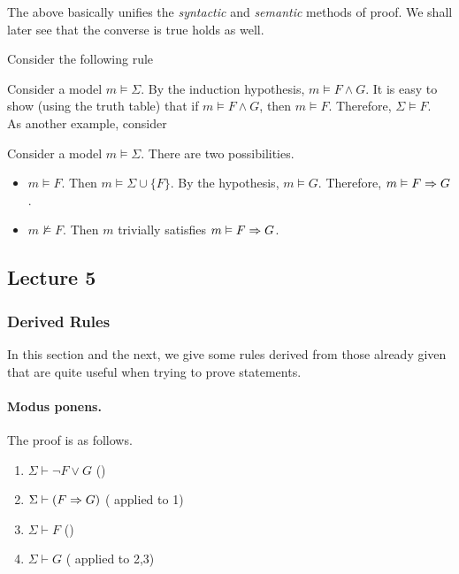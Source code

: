 The above basically unifies the \textit{syntactic} and \textit{semantic} methods of proof. We shall later see that the converse is true holds as well.

Consider the following rule
\begin{prooftree}
\end{prooftree}
Consider a model $m\vDash\Sigma$. By the induction hypothesis, $m\vDash F\wedge G$. It is easy to show (using the truth table) that if $m\vDash F\wedge G$, then $m\vDash F$. Therefore, $\Sigma\vDash F$.\\

As another example, consider
\begin{prooftree}
\end{prooftree}
Consider a model $m\vDash\Sigma$. There are two possibilities.
\begin{itemize}
	\item $m\vDash F$. Then $m\vDash \Sigma\cup\{F\}$. By the hypothesis, $m\vDash G$. Therefore, $m\vDash F\imp G$.
	\item $m\nvDash F$. Then $m$ trivially satisfies $m\vDash F\imp G$.
\end{itemize}

\subsection{Lecture 5}

\subsubsection{Derived Rules}

In this section and the next, we give some rules derived from those already given that are quite useful when trying to prove statements.

\paragraph{Modus ponens.} %
\begin{prooftree}
\end{prooftree}
The proof is as follows.
\begin{enumerate}
	\item $\Sigma\vdash\neg F\vee G$ \hfill ()
	\item $\Sigma\vdash (F\imp G)$ \hfill ( applied to 1)
	\item $\Sigma\vdash F$ \hfill ()
	\item $\Sigma\vdash G$ \hfill ( applied to 2,3) 
\end{enumerate}

